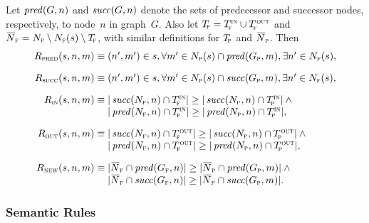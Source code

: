 \begin{definition}
  \def\fT{T_{\!\mathsc{f}}}%
  \def\pT{T_{\!\mathsc{p}}}%
  \def\fNegN{\mkern2mu\overline{\mkern-2mu N}_{\mathsc{f}}}%
  \def\pNegN{\mkern2mu\overline{\mkern-2mu N}_{\mathsc{p}}}%

  Let $\operatorname{\textrm{\textit{pred}}}(G, n)$ and $\operatorname{\textrm{\textit{succ}}}(G, n)$ denote the sets of predecessor and
  successor \glspl{node}, respectively, to \gls{node}~$n$ in \gls{graph}~$G$.
  Also let \mbox{$\fT = \fTin \cup \fTout$} and \mbox{$\fNegN = \fN \setminus
    \fN(s) \setminus \fT$}, with similar definitions for $\pT$ and $\pNegN$.
  Then
  \begin{displaymath}
    \begin{array}{r@{}l}
        \mSynPredRule(s, n, m) \equiv \mbox{}
      & \mPair{n'}{m'} \in s,
        \forall m' \in \pN(s) \cap \mPred(\pG, m),
         \exists n' \in \fN(s), \\[\abovedisplayskip]

        \mSynSuccRule(s, n, m) \equiv \mbox{}
      & \mPair{n'}{m'} \in s,
        \forall m' \in \pN(s) \cap \mSucc(\pG, m),
        \exists n' \in \fN(s), \\[\abovedisplayskip]

        \mSynInRule(s, n, m) \equiv \mbox{}
      & \mCard{\mSucc(\fN, n) \cap \fTin} \geq
        \mCard{\mSucc(\pN, n) \cap \pTin} \mAnd \mbox{} \\
      & \mCard{\mPred(\fN, n) \cap \fTin} \geq
        \mCard{\mPred(\pN, n) \cap \pTin}, \\[\abovedisplayskip]

        \mSynOutRule(s, n, m) \equiv \mbox{}
      & \mCard{\mSucc(\fN, n) \cap \fTout} \geq
        \mCard{\mSucc(\pN, n) \cap \pTout} \mAnd \mbox{} \\
      & \mCard{\mPred(\fN, n) \cap \fTout} \geq
        \mCard{\mPred(\pN, n) \cap \pTout}, \\[\abovedisplayskip]

        \mSynNewRule(s, n, m) \equiv \mbox{}
      & \mCard{\fNegN \cap \mPred(\fG, n)} \geq
        \mCard{\pNegN \cap \mPred(\pG, m)} \mAnd \mbox{} \\
      & \mCard{\fNegN \cap \mSucc(\fG, n)} \geq
        \mCard{\pNegN \cap \mSucc(\pG, m)}.
    \end{array}
  \end{displaymath}%
\end{definition}


\subsubsection{Semantic Rules}

